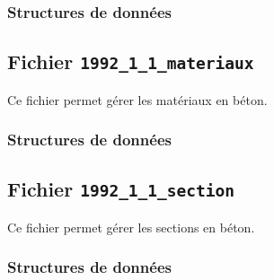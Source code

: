 \documentclass{article}
\begin{document}
\subsubsection{Structures de données}


\subsection{Fichier {\texttt{1992\_1\_1\_materiaux}}}
Ce fichier permet gérer les matériaux en béton.
\subsubsection{Structures de données}


\subsection{Fichier {\texttt{1992\_1\_1\_section}}}
Ce fichier permet gérer les sections en béton.
\subsubsection{Structures de données}




\end{document}
